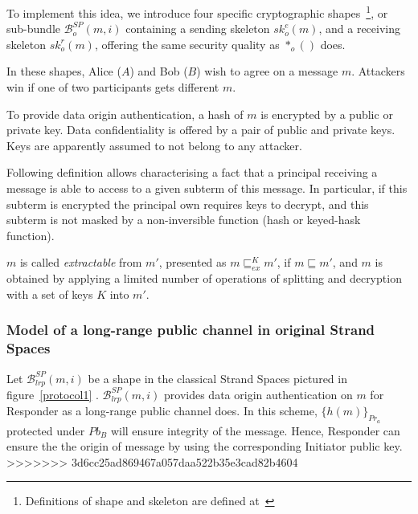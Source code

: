 To implement this idea, we introduce four specific cryptographic shapes~\footnote{Definitions of shape and skeleton are defined at~\cite{Doghmi:2007:SHS:1230146.1230260}}, or sub-bundle $\mathcal{B}^{SP}_{o}(m,i)$ containing a sending skeleton $sk^e_o(m)$, and a receiving skeleton $sk^r_o(m)$, offering the same security quality as $*_o()$ does.

In these shapes, Alice ($A$) and Bob ($B$) wish to agree on a message $m$. Attackers win if one of two participants gets different $m$. 

To provide data origin authentication, a hash of $m$ is encrypted by a public or private key. Data confidentiality is offered by a pair of public and private keys. Keys are apparently assumed to not belong to any attacker. 

Following definition allows characterising a fact that a principal receiving a message is able to access to a given subterm of this message. In particular, if this subterm is encrypted the principal own requires keys to decrypt, and this subterm is not masked by a non-inversible function (hash or keyed-hask function). 

\begin{Definition}[Extractable]
$m$ is called \emph{extractable} from $m'$, presented as $m \sqsubseteq^K_{ex} m'$, if $m \sqsubseteq m'$, and $m$ is obtained by applying a limited number of operations of splitting and decryption with a set of keys $K$ into $m'$.
\end{Definition}

\subsubsection*{Model of a long-range public channel in original Strand Spaces}\label{longrange}

Let $\mathcal{B}^{SP}_{lrp}(m,i)$ be a shape in the classical Strand Spaces pictured in figure~\ref{protocol1} . $\mathcal{B}^{SP}_{lrp}(m,i)$ provides data origin authentication on $m$ for Responder as a long-range public channel does. In this scheme, $\{h(m)\}_{Pr_a}$ protected under $Pb_B$ will ensure integrity of the message. Hence, Responder can ensure the the origin of message by using the corresponding Initiator public key. 
>>>>>>> 3d6cc25ad869467a057daa522b35e3cad82b4604

